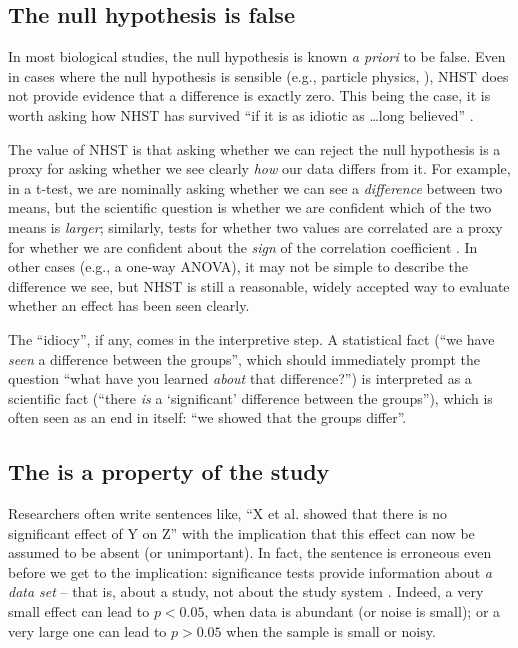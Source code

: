 \subsection*{The null hypothesis is false}

\noindent In most biological studies, the null hypothesis is known \emph{a priori} to be false. Even in cases where the null hypothesis is sensible (e.g., particle physics, \cite{Staley2017}), NHST does not provide evidence that a difference is exactly zero. This being the case, it is worth asking how NHST has survived ``if it is as idiotic as \ldots long believed'' \citet[cited in \cite{Kramer2011}]{ZiliakandMcCloskey2008}.

The value of NHST is that asking whether we can reject the null hypothesis is a proxy for asking whether we see clearly \emph{how} our data differs from it. For example, in a t-test, we are nominally asking whether we can see a \emph{difference} between two means, but the scientific question is whether we are confident which of the two means is \emph{larger}; similarly, tests for whether two values are correlated are a proxy for whether we are confident about the \emph{sign} of the correlation coefficient \citep{robinson2001past}. In other cases (e.g., a one-way ANOVA), it may not be simple to describe the difference we see, but NHST is still a reasonable, widely accepted way to evaluate whether an effect has been seen clearly.

The ``idiocy'', if any, comes in the interpretive step. A statistical fact (``we have \emph{seen} a difference between the groups'', which should immediately prompt the question ``what have you learned \emph{about} that difference?'') is interpreted as a scientific fact (``there \emph{is} a `significant' difference between the groups''), which is often seen as an end in itself: ``we showed that the groups differ''.

\subsection*{The \pval is a property of the study}

\noindent Researchers often write sentences like, ``X et al. showed that there is no significant effect of Y on Z'' with the implication that this effect can now be assumed to be absent (or unimportant). In fact, the sentence is erroneous even before we get to the implication: significance tests provide information about \emph{a data set} -- that is, about a study, not about the study system \citep{HoenigandHeisey2001}. Indeed, a very small effect can lead to $p < 0.05$, when data is abundant (or noise is small); or a very large one can lead to $p > 0.05$ when the sample is small or noisy. 

